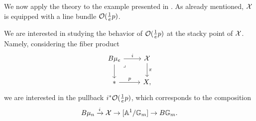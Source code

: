 We now apply the theory to the example presented in .
As already mentioned, $\mathcal{X}$ is equipped with a line bundle $\mathcal{O}(\tfrac{1}{e}p)$.

We are interested in studying the behavior of $\mathcal{O}(\frac{1}{e}p)$ at the stacky point of $\mathcal{X}$. Namely, considering the fiber product
\[\begin{tikzcd}
	{B\mu_e} & \Xc \\
	{*}      & X,
	\arrow["i", from=1-1, to=1-2]
	\arrow[from=1-1, to=2-1]
	\arrow["\lrcorner"{anchor=center, pos=0.125}, draw=none, from=1-1, to=2-2]
	\arrow["\pi", from=1-2, to=2-2]
	\arrow["p", from=2-1, to=2-2]
\end{tikzcd}\]
we are interested in the pullback $i^* \mathcal{O}(\frac{1}{e}p)$, which corresponds to the composition
\[
B\mu_n \xrightarrow{i} \mathcal{X} \to [\mathbb{A}^1 / \mathbb{G}_m] \to B\mathbb{G}_m.
\]

